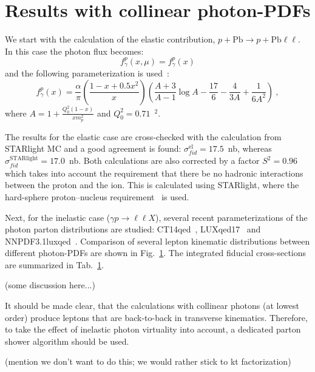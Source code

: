 \section{Results with collinear photon-PDFs}

We start with the calculation of the elastic contribution, $p+\textrm{Pb}\rightarrow p+\textrm{Pb} \ell\ell$.
In this case the photon flux becomes:
\begin{equation}
f_\gamma^{p}(x,\mu) = f_\gamma^{p}(x) 
\end{equation}
and the following parameterization is used~\cite{}:
\begin{equation}
f_\gamma^{p}(x) = \frac{\alpha}{\pi}
\left(
\frac{1-x+0.5x^2}{x}
\right)
\left(
\frac{A+3}{A-1}\log{A}-\frac{17}{6}-\frac{4}{3A}+\frac{1}{6A^2}
\right)~,
\end{equation}
where $A = 1+\frac{Q_0^2(1-x)}{x m_p^2}$ and $Q_0^2 = 0.71$~\GeV$^2$.

The results for the elastic case are cross-checked with the calculation from STARlight MC and a good agreement is found:
$\sigma_{fid}^{\textrm{el}} = 17.5$~nb, whereas $\sigma_{fid}^{\textrm{STARlight}} = 17.0$~nb.
Both calculations are also corrected by a factor $S^2=0.96$ which takes into account the requirement that there be no hadronic interactions between the proton and the ion. This is calculated using STARlight, where the hard-sphere proton--nucleus requirement~\cite{Klein:2016yzr} is used.

Next, for the inelastic case ($\gamma p\rightarrow \ell\ell X$), several recent parameterizations of the photon parton distributions are studied: CT14qed~\cite{}, LUXqed17~\cite{} and NNPDF3.1luxqed~\cite{}.
Comparison of several lepton kinematic distributions between different photon-PDFs are shown in Fig.~\ref{}.
The integrated fiducial cross-sections are summarized in Tab.~\ref{}.

(some discussion here...)

It should be made clear, that the calculations with collinear photons (at lowest order) produce leptons that are back-to-back in transverse kinematics. Therefore, to take the effect of inelastic photon virtuality into account, a dedicated parton shower algorithm should be used.

(mention we don't want to do this; we would rather stick to kt factorization)
